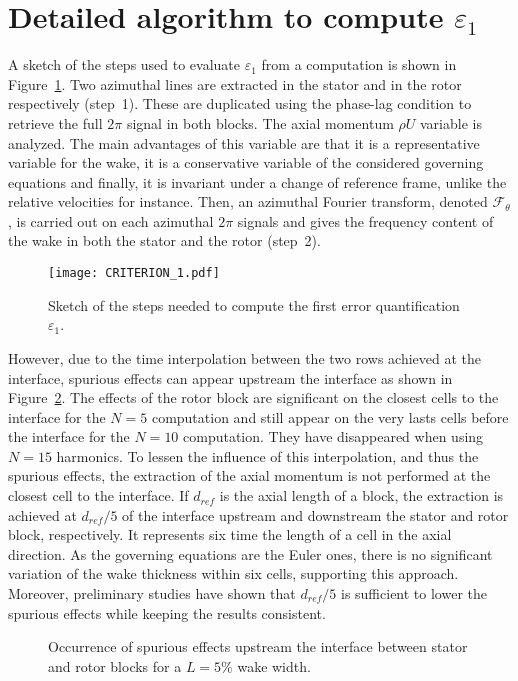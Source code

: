 
\section{Detailed algorithm to compute \texorpdfstring{$\varepsilon_1$}{e1}}
\label{app:epsilon_1_steps}

A sketch of the steps used to 
evaluate $\varepsilon_1$ from a computation is 
shown in Figure~\ref{fig:CRITERION_1}.
Two azimuthal lines are extracted in the
stator and in the rotor respectively (step~\textcircled{\small{1}}). 
These are duplicated using the phase-lag
condition to retrieve the full $2 \pi$ signal in both 
blocks. The
axial momentum $\rho U$ variable is analyzed. The main advantages of
this variable are that it is a representative variable
for the wake, it is a conservative variable of the considered governing 
equations and finally, it is invariant under a change of reference frame, 
unlike the relative velocities for instance.
Then, an azimuthal Fourier transform,
denoted $\mathcal{F}_\theta$, is carried out on each azimuthal $2 \pi$ signals 
and gives the frequency content
of the wake in both the stator and the rotor (step~\textcircled{\small{2}}).
\begin{figure}[htp]
  \centering
  \texttt{[image: CRITERION\_1.pdf]}
  \caption{Sketch of the steps needed to 
  compute the first error quantification $\varepsilon_1$.}
  \label{fig:CRITERION_1}
\end{figure}

However, due to the time interpolation 
between the two rows achieved 
at the interface, spurious effects can 
appear upstream the interface as shown in Figure~\ref{fig:rb_spurious_interf}. 
The effects of the rotor block are significant on the 
closest cells to the interface for the $N=5$ computation 
and still appear on the very lasts cells before the 
interface for the $N=10$ computation. 
They have disappeared when using $N=15$ harmonics.
To lessen the influence of this interpolation, and thus
the spurious effects,
the extraction of the axial momentum 
is not performed at the closest 
cell to the interface. If $d_{ref}$ is 
the axial length of a block, the extraction is achieved 
at $d_{ref} / 5$ of the interface upstream and downstream
the stator and rotor block, respectively. 
It represents six time the length of a cell 
in the axial direction.
As the governing equations are the Euler ones, 
there is no significant variation of the wake thickness 
within six cells, supporting this approach.
Moreover, preliminary studies have shown that $d_{ref} / 5$ is 
sufficient
to lower the spurious effects while keeping the
results consistent.
\begin{figure}[htp]
\centering
  \quad
  \quad
  \caption{Occurrence of spurious effects upstream 
  the interface between stator and rotor blocks for a $L=5\%$ wake width.}
  \label{fig:rb_spurious_interf}
\end{figure}

